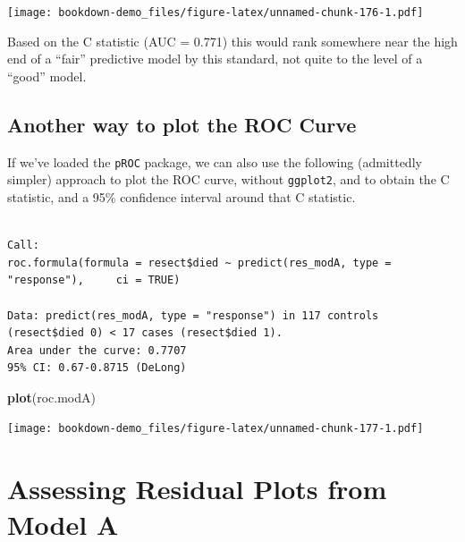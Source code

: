 \documentclass[]{book}
\newenvironment{Shaded}{\begin{snugshade}}{\end{snugshade}}
\newcommand{\KeywordTok}[1]{\textcolor[rgb]{0.13,0.29,0.53}{\textbf{#1}}}
\newcommand{\DataTypeTok}[1]{\textcolor[rgb]{0.13,0.29,0.53}{#1}}
\newcommand{\StringTok}[1]{\textcolor[rgb]{0.31,0.60,0.02}{#1}}
\newcommand{\OtherTok}[1]{\textcolor[rgb]{0.56,0.35,0.01}{#1}}
\newcommand{\OperatorTok}[1]{\textcolor[rgb]{0.81,0.36,0.00}{\textbf{#1}}}
\newcommand{\NormalTok}[1]{#1}
\theoremstyle{definition}
\theoremstyle{definition}
\theoremstyle{definition}
\theoremstyle{remark}
\begin{document}
\texttt{[image: bookdown-demo\_files/figure-latex/unnamed-chunk-176-1.pdf]}

Based on the C statistic (AUC = 0.771) this would rank somewhere near
the high end of a ``fair'' predictive model by this standard, not quite
to the level of a ``good'' model.

\subsection{Another way to plot the ROC
Curve}\label{another-way-to-plot-the-roc-curve}

If we've loaded the \texttt{pROC} package, we can also use the following
(admittedly simpler) approach to plot the ROC curve, without
\texttt{ggplot2}, and to obtain the C statistic, and a 95\% confidence
interval around that C statistic.

\begin{Shaded}
\end{Shaded}

\begin{verbatim}

Call:
roc.formula(formula = resect$died ~ predict(res_modA, type = "response"),     ci = TRUE)

Data: predict(res_modA, type = "response") in 117 controls (resect$died 0) < 17 cases (resect$died 1).
Area under the curve: 0.7707
95% CI: 0.67-0.8715 (DeLong)
\end{verbatim}

\begin{Shaded}
\begin{Highlighting}[]
\KeywordTok{plot}\NormalTok{(roc.modA)}
\end{Highlighting}
\end{Shaded}

\texttt{[image: bookdown-demo\_files/figure-latex/unnamed-chunk-177-1.pdf]}

\section{Assessing Residual Plots from Model
A}\label{assessing-residual-plots-from-model-a}
\end{document}
